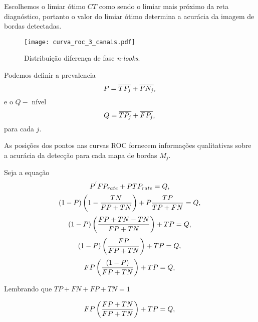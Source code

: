 Escolhemos o limiar ótimo $CT$ como sendo o limiar mais próximo da reta diagnóstico, 
portanto o valor do limiar ótimo  determina a acurácia da imagem de bordas detectadas. 

\begin{figure}[hbt]
\centering
\texttt{[image: curva\_roc\_3\_canais.pdf]}
	\caption{Distribuição diferença de fase {\it n-looks}.}
\label{cap_fusao_fig03}
\end{figure}

Podemos definir a prevalencia
\begin{equation}\label{cap_fusao_25}
	P =\overline{TP_j}+\overline{FN_j}, \\
\end{equation}
e o $Q-$ nível
\begin{equation}\label{cap_fusao_26}
	Q =\overline{TP_j}+\overline{FP_j}, \\
\end{equation}
para cada $j$.


As posições dos pontos nas curvas ROC fornecem informações qualitativas sobre a acurácia da detecção para cada mapa de bordas $M_j$. 

Seja a equação
\begin{equation}\label{cap_fusao_27}
     P^{'}FP_{rate}+P TP_{rate} = Q, \\
\end{equation}
\begin{equation}\label{cap_fusao_28}
     (1-P)\left(1-\frac{TN}{FP+TN}\right)+P \frac{TP}{TP+FN} = Q, \\
\end{equation}
\begin{equation}\label{cap_fusao_29}
     (1-P) \left(\frac{FP+TN-TN}{FP+TN}\right)+TP = Q, \\
\end{equation}
\begin{equation}\label{cap_fusao_30}
     (1-P) \left(\frac{FP}{FP+TN}\right)+TP = Q, \\
\end{equation}
\begin{equation}\label{cap_fusao_31}
      FP\left(\frac{(1-P)}{FP+TN}\right)+TP = Q, \\
\end{equation}

 Lembrando que $TP+FN+FP+TN=1$

\begin{equation}\label{cap_fusao_32}
      FP\left(\frac{FP+TN}{FP+TN}\right)+TP = Q, \\
\end{equation}

